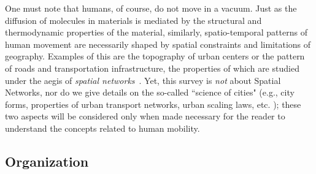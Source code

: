 
One must note that humans, of course, do not move in a vacuum. Just as the diffusion of molecules in materials is mediated by the structural and thermodynamic properties of the material, similarly, spatio-temporal patterns of human movement are necessarily shaped by spatial constraints and limitations of geography. Examples of this are the topography of urban centers or the pattern of roads and transportation infrastructure, the properties of which are studied under the aegis of \emph{spatial networks}~\cite{barthelemy_2011_spatial}. Yet, this survey is \emph{not} about Spatial Networks, nor do we give details on the so-called ``science of cities" (e.g., city forms, properties of urban transport networks, urban scaling laws, etc. \cite{barthelemy_2016_structure}); these two aspects will be considered only when made necessary for the reader to understand the concepts related to human mobility.


\subsection{Organization}

